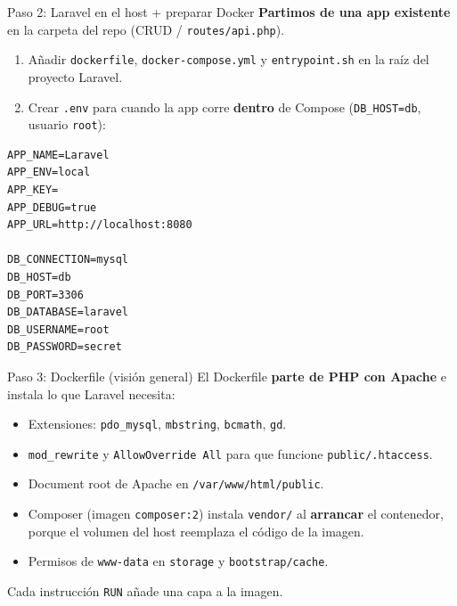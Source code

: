 \documentclass[aspectratio=169,10pt]{beamer}
\begin{document}
\begin{frame}[fragile]{Paso 2: Laravel en el host + preparar Docker}
  \textbf{Partimos de una app existente} en la carpeta del repo (CRUD / \texttt{routes/api.php}).
  \vspace{0.4em}
  \begin{enumerate}
    \item Añadir \texttt{dockerfile}, \texttt{docker-compose.yml} y \texttt{entrypoint.sh} en la raíz del proyecto Laravel.
    \item Crear \texttt{.env} para cuando la app corre \textbf{dentro} de Compose (\texttt{DB\_HOST=db}, usuario \texttt{root}):
  \end{enumerate}
\begin{lstlisting}
APP_NAME=Laravel
APP_ENV=local
APP_KEY=
APP_DEBUG=true
APP_URL=http://localhost:8080

DB_CONNECTION=mysql
DB_HOST=db
DB_PORT=3306
DB_DATABASE=laravel
DB_USERNAME=root
DB_PASSWORD=secret
\end{lstlisting}
\end{frame}

\begin{frame}{Paso 3: Dockerfile (visión general)}
  El Dockerfile \textbf{parte de PHP con Apache} e instala lo que Laravel necesita:
  \begin{itemize}
    \item Extensiones: \texttt{pdo\_mysql}, \texttt{mbstring}, \texttt{bcmath}, \texttt{gd}.
    \item \texttt{mod\_rewrite} y \texttt{AllowOverride All} para que funcione \texttt{public/.htaccess}.
    \item Document root de Apache en \texttt{/var/www/html/public}.
    \item Composer (imagen \texttt{composer:2}) instala \texttt{vendor/} al \textbf{arrancar} el contenedor, porque el volumen del host reemplaza el código de la imagen.
    \item Permisos de \texttt{www-data} en \texttt{storage} y \texttt{bootstrap/cache}.
  \end{itemize}
  \vspace{0.3em}
  Cada instrucción \texttt{RUN} añade una capa a la imagen.
\end{frame}
\end{document}
